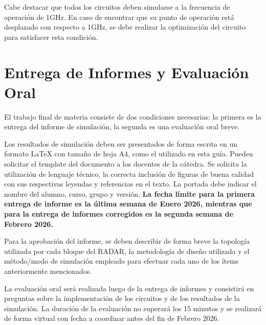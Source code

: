 Cabe destacar que todos los circuitos deben simularse a la frecuencia de operación de 1GHz. En caso de encontrar que su punto de operación está desplazado con respecto a 1GHz, se debe realizar la optimización del circuito para satisfacer esta condición.

\section{Entrega de Informes y Evaluación Oral}

El trabajo final de materia consiste de dos condiciones necesarias: la primera es la entrega del informe de simulación, la segunda es una evaluación oral breve.

Los resultados de simulación deben ser presentados de forma escrita en un formato LaTeX con tamaño de hoja A4, como el utilizado en esta guía. Pueden solicitar el template del documento a los docentes de la cátedra. Se solicita la utilización de lenguaje técnico, la correcta inclusión de figuras de buena calidad con sus respectivas leyendas y referencias en el texto. La portada debe indicar el nombre del alumno, curso, grupo y versión. \textbf{La fecha límite para la primera entrega de informe es la última semana de Enero 2026, mientras que para la entrega de informes corregidos es la segunda semana de Febrero 2026.}

Para la aprobación del informe, se deben describir de forma breve la topología utilizada por cada bloque del RADAR, la metodología de diseño utilizada y el método/modo de simulación empleado para efectuar cada uno de los ítems anteriormente mencionados.

La evaluación oral será realizada luego de la entrega de informes y consistirá en preguntas sobre la implementación de los circuitos y de los resultados de la simulación. La duración de la evaluación no superará los 15 minutos y se realizará de forma virtual con fecha a coordinar antes del fin de Febrero 2026.
